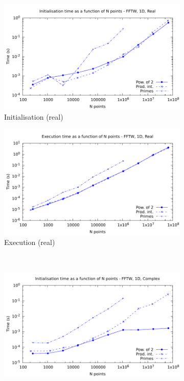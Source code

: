 \documentclass[12pt, a4paper]{article} \setlength{\textheight}{24cm}
\begin{document}
 
\begin{figure}[htb]
  \captionsetup{width=0.8\linewidth}
  \centering
  \begin{subfigure}{.5\textwidth}
    \centering
    \includegraphics[width=.9\linewidth]{graphs/1d-fftw-init-r.pdf}
    \caption{Initialisation (real)}
    \label{1DFFTWRI}
  \end{subfigure}%
  \begin{subfigure}{.5\textwidth}
    \centering
    \includegraphics[width=.9\linewidth]{graphs/1d-fftw-exec-r.pdf}
    \caption{Execution (real)}
    \label{1DFFTWR}
  \end{subfigure}\\
  \begin{subfigure}{.5\textwidth}
    \centering
    \includegraphics[width=.9\linewidth]{graphs/1d-fftw-init-c.pdf}

\end{subfigure}
\end{figure}
\end{document}
